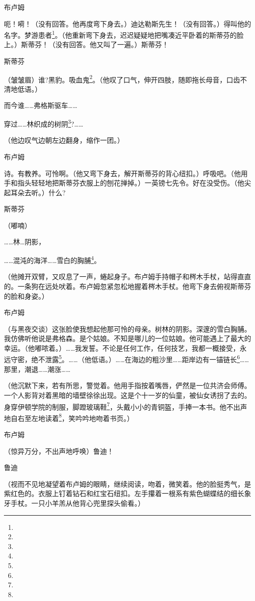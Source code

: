 \par 布卢姆
\par 呃！嗬！（没有回答。他再度弯下身去。）迪达勒斯先生！（没有回答。）得叫他的名字。梦游患者\footnote{}。（他重新弯下身去，迟迟疑疑地把嘴凑近平卧着的斯蒂芬的脸上。）斯蒂芬！（没有回答。他又叫了一遍。）斯蒂芬！
\par 斯蒂芬
\par （皱皱眉）谁?黑豹。吸血鬼\footnote{}。（他叹了口气，伸开四肢，随即拖长母音，口齿不清地低语。）
\par 而今谁……弗格斯驱车……
\par 穿过……林织成的树阴\footnote{}?……
\par （他边叹气边朝左边翻身，缩作一团。）
\par 布卢姆
\par 诗。有教养。可怜啊。（他又弯下身去，解开斯蒂芬的背心纽扣。）呼吸吧。（他用手和指头轻轻地把斯蒂芬衣服上的刨花掸掉。）一英镑七先令。好在没受伤。（他尖起耳朵去听。）什么?
\par 斯蒂芬
\par （嘟喃）
\par ……林…阴影，
\par ……混沌的海洋……雪白的胸脯\footnote{}。
\par （他摊开双臂，又叹息了一声，蜷起身子。布卢姆手持帽子和梣木手杖，站得直直的。一条狗在远处吠着。布卢姆忽紧忽松地握着梣木手杖。他弯下身去俯视斯蒂芬的脸和身姿。）
\par 布卢姆
\par （与黑夜交谈）这张脸使我想起他那可怜的母亲。树林的阴影。深邃的雪白胸脯。我仿佛听他说是弗格森。是个姑娘。不知是哪儿的一位姑娘。他可能遇上了最大的幸运。（他嘟哝着。）……我发誓。不论是任何工作，任何技艺，我都一概接受，永远守密，绝不泄露\footnote{}。……（他低语。）……在海边的粗沙里……距岸边有一锚链长\footnote{}……那里，潮退……潮涨……
\par （他沉默下来，若有所思，警觉着。他用手指按着嘴唇，俨然是一位共济会师傅。一个人影背对着黑暗的墙壁徐徐出现。这是个十一岁的仙童，被仙女诱拐了去的。身穿伊顿学院的制服，脚蹬玻璃鞋\footnote{}，头戴小小的青铜盔，手捧一本书。他不出声地自右至左地读着\footnote{}，笑吟吟地吻着书页。）
\par 布卢姆
\par （惊异万分，不出声地呼唤）鲁迪！
\par 鲁迪
\par （视而不见地凝望着布卢姆的眼睛，继续阅读，吻着，微笑着。他的脸挺秀气，是紫红色的。衣服上钉着钻石和红宝石纽扣。左手攥着一根系有紫色蝴蝶结的细长象牙手杖。一只小羊羔从他背心兜里探头偷看。）










